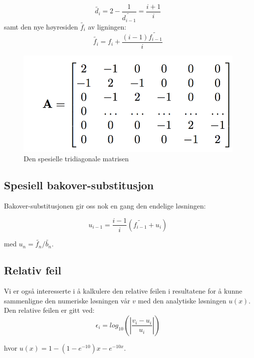 \documentclass[twocolumn]{article}
\begin{document}
\begin{equation}
\tilde{d_i} = 2 - \frac{1}{\tilde{d_{i-1}}} = \frac{i+1}{i}
\end{equation}
samt den nye høyresiden $\tilde{f_i}$ av ligningen:
\begin{equation}
\tilde{f_i} = f_i + \frac{(i-1)\tilde{f_{i-1}}}{i}
\end{equation}

\begin{figure}[h!]
  \includegraphics[width=\linewidth]{pict_2.png}
  \caption{Den spesielle tridiagonale matrisen}
\end{figure}

\subsection*{Spesiell bakover-substitusjon}
Bakover-substitusjonen gir oss nok en gang den endelige løsningen:

\begin{equation}
u_{i-1} = \frac{i-1}{i} (\tilde{f_{i-1}} + u_i)
\end{equation}

med $u_n = \tilde{f_n} / \tilde{b_n}$.

\subsection*{Relativ feil}
Vi er også interesserte i å kalkulere den relative feilen i resultatene for å kunne sammenligne den numeriske løsningen vår $v$ med den analytiske løsningen $u(x)$.
Den relative feilen er gitt ved:
\begin{equation}
\epsilon_i=log_{10}\left(\left|\frac{v_i-u_i}
                 {u_i}\right|\right)
\end{equation}

hvor $u(x) = 1-(1-e^{-10})x-e^{-10x}$.
\newpage
\end{document}
